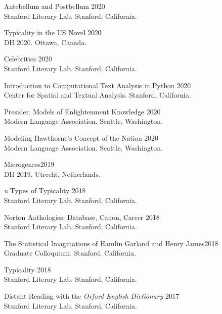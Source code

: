 \documentclass[
  12pt,
  letterpaper,
]{article}
\begin{document}
Antebellum and Postbellum \hfill 2020\\
\hspace*{0.333em} Stanford Literary Lab. Stanford, California.

Typicality in the US Novel \hfill 2020\\
\hspace*{0.333em} DH 2020. Ottawa, Canada.

Celebrities \hfill 2020\\
\hspace*{0.333em} Stanford Literary Lab. Stanford, California.

Introduction to Computational Text Analysis in Python \hfill 2020\\
\hspace*{0.333em} Center for Spatial and Textual Analysis. Stanford,
California.

Presider, Models of Enlightenment Knowledge \hfill 2020\\
\hspace*{0.333em} Modern Language Association. Seattle, Washington.

Modeling Hawthorne's Concept of the Nation \hfill 2020\\
\hspace*{0.333em} Modern Language Association. Seattle, Washington.

Microgenres\hfill 2019\\
\hspace*{0.333em} DH 2019. Utrecht, Netherlands.

\emph{n} Types of Typicality \hfill 2018\\
\hspace*{0.333em} Stanford Literary Lab. Stanford, California.

Norton Anthologies: Database, Canon, Career \hfill 2018\\
\hspace*{0.333em} Stanford Literary Lab. Stanford, California.

The Statistical Imaginations of Hamlin Garland and Henry
James\hfill 2018\\
\hspace*{0.333em} Graduate Colloquium. Stanford, California.

Typicality \hfill 2018\\
\hspace*{0.333em} Stanford Literary Lab. Stanford, California.

Distant Reading with the \emph{Oxford English Dictionary} \hfill 2017\\
\hspace*{0.333em} Stanford Literary Lab. Stanford, California.
\end{document}
